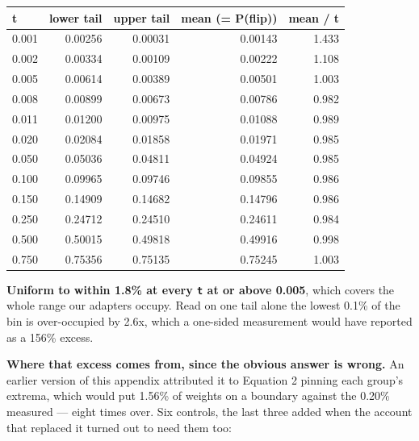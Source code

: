 \begin{center}\footnotesize
\begin{tabular}{lrrrr}
\toprule
t & lower tail & upper tail & mean (= P(flip)) & mean / t \\
\midrule
0.001 & 0.00256 & 0.00031 & 0.00143 & 1.433 \\
0.002 & 0.00334 & 0.00109 & 0.00222 & 1.108 \\
0.005 & 0.00614 & 0.00389 & 0.00501 & 1.003 \\
0.008 & 0.00899 & 0.00673 & 0.00786 & 0.982 \\
0.011 & 0.01200 & 0.00975 & 0.01088 & 0.989 \\
0.020 & 0.02084 & 0.01858 & 0.01971 & 0.985 \\
0.050 & 0.05036 & 0.04811 & 0.04924 & 0.985 \\
0.100 & 0.09965 & 0.09746 & 0.09855 & 0.986 \\
0.150 & 0.14909 & 0.14682 & 0.14796 & 0.986 \\
0.250 & 0.24712 & 0.24510 & 0.24611 & 0.984 \\
0.500 & 0.50015 & 0.49818 & 0.49916 & 0.998 \\
0.750 & 0.75356 & 0.75135 & 0.75245 & 1.003 \\
\bottomrule
\end{tabular}
\end{center}

\textbf{Uniform to within 1.8\% at every \texttt{t} at or above 0.005}, which covers the whole range our adapters occupy. Read on one tail alone the lowest 0.1\% of the bin is over-occupied by 2.6x, which a one-sided measurement would have reported as a 156\% excess.

\textbf{Where that excess comes from, since the obvious answer is wrong.} An earlier version of this appendix attributed it to Equation 2 pinning each group's extrema, which would put 1.56\% of weights on a boundary against the 0.20\% measured --- eight times over. Six controls, the last three added when the account that replaced it turned out to need them too:

